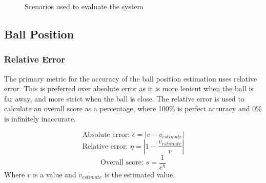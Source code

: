 \begin{figure}[H]
%
\caption{Scenarios used to evaluate the system}
\label{fig: scenarios}
\end{figure}

\subsection{Ball Position}

\subsubsection{Relative Error}

The primary metric for the accuracy of the ball position estimation uses relative error. This is preferred over absolute error as it is more lenient when the ball is far away, and more strict when the ball is close. The relative error is used to calculate an overall score as a percentage, where 100\% is perfect accuracy and 0\% is infinitely inaccurate. 

\[ \text{Absolute error: } \epsilon =  |v - v_{estimate}|\]
\[ \text{Relative error: } \eta =  |1 - \frac{v_{estimate}}{v}|\]
\[ \text{Overall score: } s = \frac{1}{e^{\eta}} \]
Where $v$ is a value and $v_{estimate}$ is the estimated value.

